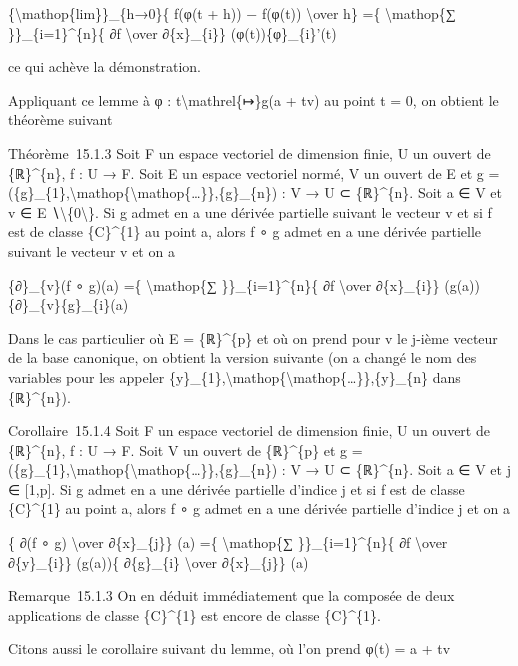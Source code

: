 \{\textbackslash{}mathop\{lim\}\}\_\{h→0\}\{ f(φ(t + h)) − f(φ(t))
\textbackslash{}over h\} =\{ \textbackslash{}mathop\{∑
\}\}\_\{i=1\}\^{}\{n\}\{ ∂f \textbackslash{}over ∂\{x\}\_\{i\}\}
(φ(t))\{φ\}\_\{i\}'(t)

ce qui achève la démonstration.

Appliquant ce lemme à φ : t\textbackslash{}mathrel\{↦\}g(a + tv) au
point t = 0, on obtient le théorème suivant

Théorème~15.1.3 Soit F un espace vectoriel de dimension finie, U un
ouvert de \{ℝ\}\^{}\{n\}, f : U → F. Soit E un espace vectoriel normé, V
un ouvert de E et g =
(\{g\}\_\{1\},\textbackslash{}mathop\{\textbackslash{}mathop\{\ldots{}\}\},\{g\}\_\{n\})
: V → U ⊂ \{ℝ\}\^{}\{n\}. Soit a ∈ V et v ∈ E
∖\textbackslash{}\{0\textbackslash{}\}. Si g admet en a une dérivée
partielle suivant le vecteur v et si f est de classe \{C\}\^{}\{1\} au
point a, alors f ∘ g admet en a une dérivée partielle suivant le vecteur
v et on a

\{∂\}\_\{v\}(f ∘ g)(a) =\{ \textbackslash{}mathop\{∑
\}\}\_\{i=1\}\^{}\{n\}\{ ∂f \textbackslash{}over ∂\{x\}\_\{i\}\}
(g(a))\{∂\}\_\{v\}\{g\}\_\{i\}(a)

Dans le cas particulier où E = \{ℝ\}\^{}\{p\} et où on prend pour v le
j-ième vecteur de la base canonique, on obtient la version suivante (on
a changé le nom des variables pour les appeler
\{y\}\_\{1\},\textbackslash{}mathop\{\textbackslash{}mathop\{\ldots{}\}\},\{y\}\_\{n\}
dans \{ℝ\}\^{}\{n\}).

Corollaire~15.1.4 Soit F un espace vectoriel de dimension finie, U un
ouvert de \{ℝ\}\^{}\{n\}, f : U → F. Soit V un ouvert de \{ℝ\}\^{}\{p\}
et g =
(\{g\}\_\{1\},\textbackslash{}mathop\{\textbackslash{}mathop\{\ldots{}\}\},\{g\}\_\{n\})
: V → U ⊂ \{ℝ\}\^{}\{n\}. Soit a ∈ V et j ∈ {[}1,p{]}. Si g admet en a
une dérivée partielle d'indice j et si f est de classe \{C\}\^{}\{1\} au
point a, alors f ∘ g admet en a une dérivée partielle d'indice j et on a

\{ ∂(f ∘ g) \textbackslash{}over ∂\{x\}\_\{j\}\} (a) =\{
\textbackslash{}mathop\{∑ \}\}\_\{i=1\}\^{}\{n\}\{ ∂f
\textbackslash{}over ∂\{y\}\_\{i\}\} (g(a))\{ ∂\{g\}\_\{i\}
\textbackslash{}over ∂\{x\}\_\{j\}\} (a)

Remarque~15.1.3 On en déduit immédiatement que la composée de deux
applications de classe \{C\}\^{}\{1\} est encore de classe
\{C\}\^{}\{1\}.

Citons aussi le corollaire suivant du lemme, où l'on prend φ(t) = a + tv

